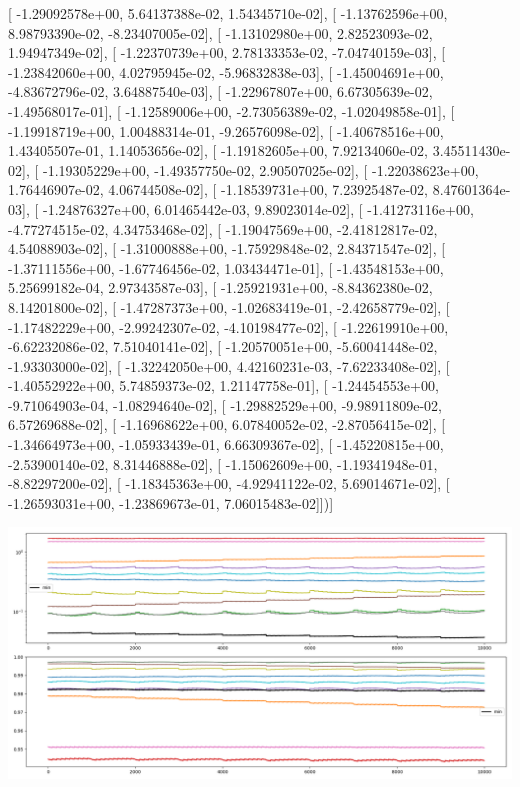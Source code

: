 \documentclass{article}
\begin{document}
       [ -1.29092578e+00,   5.64137388e-02,   1.54345710e-02],
       [ -1.13762596e+00,   8.98793390e-02,  -8.23407005e-02],
       [ -1.13102980e+00,   2.82523093e-02,   1.94947349e-02],
       [ -1.22370739e+00,   2.78133353e-02,  -7.04740159e-03],
       [ -1.23842060e+00,   4.02795945e-02,  -5.96832838e-03],
       [ -1.45004691e+00,  -4.83672796e-02,   3.64887540e-03],
       [ -1.22967807e+00,   6.67305639e-02,  -1.49568017e-01],
       [ -1.12589006e+00,  -2.73056389e-02,  -1.02049858e-01],
       [ -1.19918719e+00,   1.00488314e-01,  -9.26576098e-02],
       [ -1.40678516e+00,   1.43405507e-01,   1.14053656e-02],
       [ -1.19182605e+00,   7.92134060e-02,   3.45511430e-02],
       [ -1.19305229e+00,  -1.49357750e-02,   2.90507025e-02],
       [ -1.22038623e+00,   1.76446907e-02,   4.06744508e-02],
       [ -1.18539731e+00,   7.23925487e-02,   8.47601364e-03],
       [ -1.24876327e+00,   6.01465442e-03,   9.89023014e-02],
       [ -1.41273116e+00,  -4.77274515e-02,   4.34753468e-02],
       [ -1.19047569e+00,  -2.41812817e-02,   4.54088903e-02],
       [ -1.31000888e+00,  -1.75929848e-02,   2.84371547e-02],
       [ -1.37111556e+00,  -1.67746456e-02,   1.03434471e-01],
       [ -1.43548153e+00,   5.25699182e-04,   2.97343587e-03],
       [ -1.25921931e+00,  -8.84362380e-02,   8.14201800e-02],
       [ -1.47287373e+00,  -1.02683419e-01,  -2.42658779e-02],
       [ -1.17482229e+00,  -2.99242307e-02,  -4.10198477e-02],
       [ -1.22619910e+00,  -6.62232086e-02,   7.51040141e-02],
       [ -1.20570051e+00,  -5.60041448e-02,  -1.93303000e-02],
       [ -1.32242050e+00,   4.42160231e-03,  -7.62233408e-02],
       [ -1.40552922e+00,   5.74859373e-02,   1.21147758e-01],
       [ -1.24454553e+00,  -9.71064903e-04,  -1.08294640e-02],
       [ -1.29882529e+00,  -9.98911809e-02,   6.57269688e-02],
       [ -1.16968622e+00,   6.07840052e-02,  -2.87056415e-02],
       [ -1.34664973e+00,  -1.05933439e-01,   6.66309367e-02],
       [ -1.45220815e+00,  -2.53900140e-02,   8.31446888e-02],
       [ -1.15062609e+00,  -1.19341948e-01,  -8.82297200e-02],
       [ -1.18345363e+00,  -4.92941122e-02,   5.69014671e-02],
       [ -1.26593031e+00,  -1.23869673e-01,   7.06015483e-02]])]
\begin{center}
\includegraphics[scale=.9]{control_dpn_all.png}

\end{center}
\end{document}
